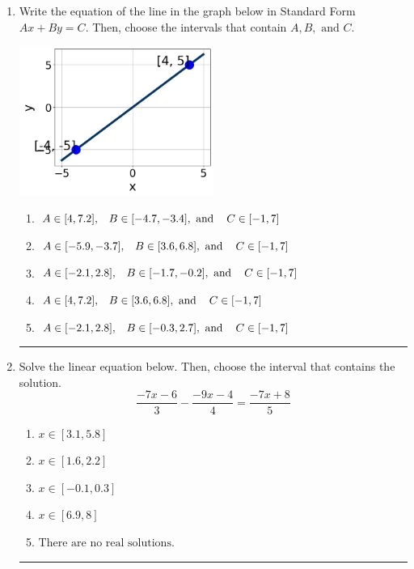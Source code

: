 \documentclass[14pt]{extbook}
\newcommand{\litem}[1]{\item#1\hspace*{-1cm}\rule{\textwidth}{0.4pt}}
\begin{document}
\begin{enumerate}
{\begin{enumerate}[label=\Alph*.]
\end{enumerate} }
\litem{
Write the equation of the line in the graph below in Standard Form $Ax+By=C$. Then, choose the intervals that contain $A, B, \text{ and } C$.
\begin{center}
    \includegraphics[width=0.5\textwidth]{../Figures/linearGraphToStandardB.png}
\end{center}
\begin{enumerate}[label=\Alph*.]
\item \( A \in [4, 7.2], \hspace{3mm} B \in [-4.7, -3.4], \text{ and } \hspace{3mm} C \in [-1, 7] \)
\item \( A \in [-5.9, -3.7], \hspace{3mm} B \in [3.6, 6.8], \text{ and } \hspace{3mm} C \in [-1, 7] \)
\item \( A \in [-2.1, 2.8], \hspace{3mm} B \in [-1.7, -0.2], \text{ and } \hspace{3mm} C \in [-1, 7] \)
\item \( A \in [4, 7.2], \hspace{3mm} B \in [3.6, 6.8], \text{ and } \hspace{3mm} C \in [-1, 7] \)
\item \( A \in [-2.1, 2.8], \hspace{3mm} B \in [-0.3, 2.7], \text{ and } \hspace{3mm} C \in [-1, 7] \)

\end{enumerate} }
\litem{
Solve the linear equation below. Then, choose the interval that contains the solution.\[ \frac{-7x -6}{3} - \frac{-9x -4}{4} = \frac{-7x + 8}{5} \]\begin{enumerate}[label=\Alph*.]
\item \( x \in [3.1, 5.8] \)
\item \( x \in [1.6, 2.2] \)
\item \( x \in [-0.1, 0.3] \)
\item \( x \in [6.9, 8] \)
\item \( \text{There are no real solutions.} \)


\end{enumerate}}
\end{enumerate}
\end{document}
